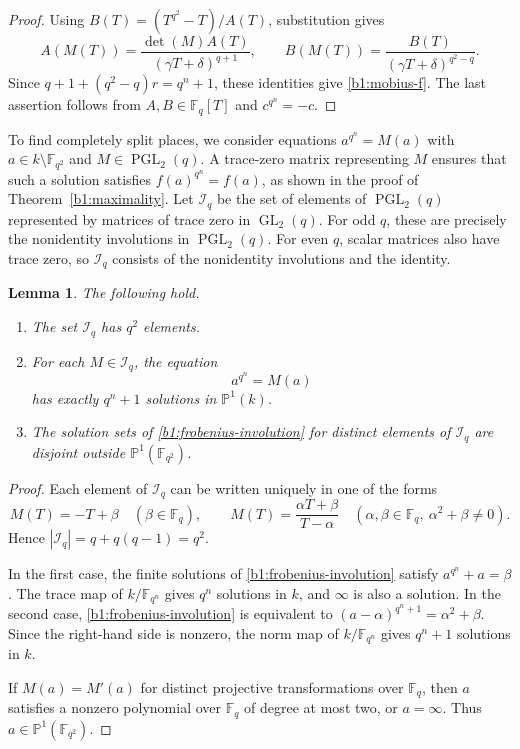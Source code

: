 \documentclass[10pt,a4paper]{amsart}
\numberwithin{equation}{section}
\newcommand{\F}{\mathbb F}
\newcommand{\PP}{\mathbb P}
\DeclareMathOperator{\GL}{GL}
\DeclareMathOperator{\PGL}{PGL}
\newtheorem{lemma}[theorem]{Lemma}
\begin{document}
\begin{proof}
Using \(B(T)=(T^{q^2}-T)/A(T)\), substitution gives
\[
 A(M(T))=\frac{\det(M)A(T)}{(\gamma T+\delta)^{q+1}},\qquad
 B(M(T))=\frac{B(T)}{(\gamma T+\delta)^{q^2-q}}.
\]
Since \(q+1+(q^2-q)r=q^n+1\), these identities give
\eqref{b1:mobius-f}.  The last assertion follows from
\(A,B\in\F_q[T]\) and \(c^{q^n}=-c\).
\end{proof}

To find completely split places, we consider equations
\(a^{q^n}=M(a)\) with \(a\in k\setminus\F_{q^2}\) and
\(M\in\PGL_2(q)\). A trace-zero matrix representing \(M\) ensures
that such a solution satisfies \(f(a)^{q^n}=f(a)\), as shown in the
proof of Theorem~\ref{b1:maximality}.
Let \(\mathcal I_q\) be the set of elements of \(\PGL_2(q)\)
represented by matrices of trace zero in \(\GL_2(q)\).
For odd \(q\), these are precisely
the nonidentity involutions in \(\PGL_2(q)\). For even \(q\), scalar
matrices also have trace zero, so \(\mathcal I_q\) consists of the
nonidentity involutions and the identity.

\begin{lemma}
\label{b1:involution-solutions}
The following hold.
\begin{enumerate}
\item\label{b1:involution-cardinality}
The set \(\mathcal I_q\) has \(q^2\) elements.
\item\label{b1:involution-root-count}
For each
\(M\in\mathcal I_q\), the equation
\begin{equation}
\label{b1:frobenius-involution}
 a^{q^n}=M(a)
\end{equation}
has exactly \(q^n+1\) solutions in \(\PP^1(k)\).
\item\label{b1:involution-disjointness}
The solution sets of \eqref{b1:frobenius-involution} for
distinct elements of \(\mathcal I_q\) are disjoint outside
\(\PP^1(\F_{q^2})\).
\end{enumerate}
\end{lemma}

\begin{proof}
Each element of \(\mathcal I_q\) can be written uniquely in one of the forms
\[
 M(T)=-T+\beta\quad(\beta\in\F_q),\qquad
 M(T)=\frac{\alpha T+\beta}{T-\alpha}
 \quad(\alpha,\beta\in\F_q,\ \alpha^2+\beta\ne0).
\]
Hence \(|\mathcal I_q|=q+q(q-1)=q^2\).

In the first case, the finite solutions of
\eqref{b1:frobenius-involution} satisfy \(a^{q^n}+a=\beta\).
The trace map of \(k/\F_{q^n}\) gives \(q^n\) solutions in \(k\),
and \(\infty\) is also a solution.
In the second case, \eqref{b1:frobenius-involution} is equivalent to
\((a-\alpha)^{q^n+1}=\alpha^2+\beta\).
Since the right-hand side is nonzero, the norm map of
\(k/\F_{q^n}\) gives \(q^n+1\) solutions in \(k\).

If \(M(a)=M'(a)\) for distinct projective transformations over
\(\F_q\), then \(a\) satisfies a nonzero polynomial over \(\F_q\)
of degree at most two, or \(a=\infty\).  Thus
\(a\in\PP^1(\F_{q^2})\).
\end{proof}
\end{document}
